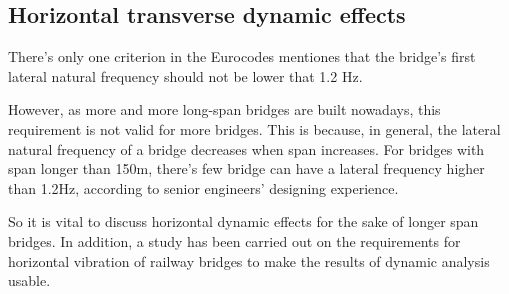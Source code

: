 \begin{appendices}
\section{Horizontal transverse dynamic effects}
There's only one criterion in the Eurocodes mentiones that the bridge's first lateral natural frequency should not be lower that 1.2 Hz. 

However, as more and more long-span bridges are built nowadays, this requirement is not valid for more bridges. This is because, in general, the lateral natural frequency of a bridge decreases when span increases. For bridges with span longer than 150m, there's few bridge can have a lateral frequency higher than 1.2Hz, according to senior engineers' designing experience.

So it is vital to discuss horizontal dynamic effects for the sake of longer span bridges. In addition, a study has been carried out on the requirements for horizontal vibration of railway bridges to make the results of dynamic analysis usable.









\end{appendices}
